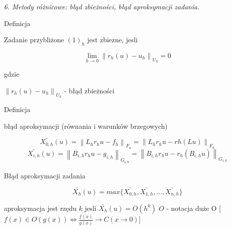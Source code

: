 \textit{6. Metody różnicowe: błąd zbieżności, błąd aproksymacji zadania.}

Definicja

Zadanie przybliżone $(1)_h$ jest zbiezne, jesli

\[ \lim_{h \rightarrow 0} \left \| r_h(u) - u_h \right \|_{U_h} = 0 \]

gdzie

$\left \| r_h(u) - u_h \right \|_{U_h}$ - błąd zbieżności

Definicja

błąd aproksymacji (równania i warunków brzegowych)

\[ \bar{X_{0,h}} (u) = \left \| L_h r_h u - f_h \right \| _{F_u} = \left \| L_hr_hu - rh(Lu) \right \| _{F_h} \]
\[ \bar{X_{i,h}} (u) = \left \| B_{i,h} r_h u - g_{i,h} \right \|_{G_{i,h}} = \left \| B_{i,h} r_h u - r_h (B_{i,h} u) \right \| _{G_{i,h}} \]

Błąd aproksymacji zadania

\[ \bar{X_h} (u) = max \{ \bar{X_{0,h}}, \bar{X_{1,h}}, ..., \bar{X_{n,h}} \} \]

aproksymacja jest rzędu $k$ jesli $\bar{X_h} (u) = O(h^k)$ $O$ - notacja duże O [$ f(x) \in O(g(x)) \Leftrightarrow \frac{f(x)}{g(x)} \rightarrow C (x \rightarrow 0)$]



